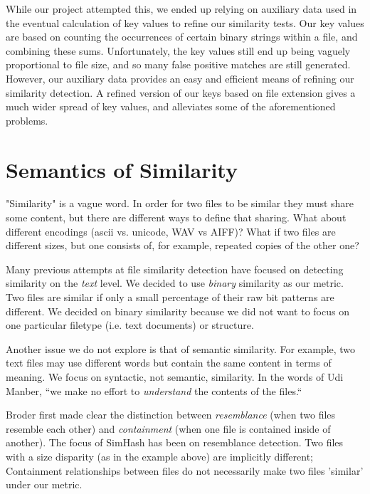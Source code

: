 \documentclass[10pt, twocolumn]{article}
\begin{document}
While our project attempted this, we ended up relying on auxiliary data used in the eventual calculation of key values to refine our similarity tests.  Our key values are based on counting the occurrences of certain binary strings within a file, and combining these sums.  Unfortunately, the key values still end up being vaguely proportional to file size, and so many false positive matches are still generated.  However, our auxiliary data provides an easy and efficient means of refining our similarity detection.  A refined version of our keys based on file extension gives a much wider spread of key values, and alleviates some of the aforementioned problems.

\section{Semantics of Similarity}

"Similarity" is a vague word. In order for two files to be similar they must share some content, but there are different ways to define that sharing. What about different encodings (ascii vs. unicode, WAV vs AIFF)? What if two files are different sizes, but one consists of, for example, repeated copies of the other one? 

Many previous attempts at file similarity detection have focused on detecting similarity on the \emph{text} \cite{hpDocRepositories, hoad} level. We decided to use \emph{binary} similarity as our metric. Two files are similar if only a small percentage of their raw bit patterns are different. We decided on binary similarity because we did not want to focus on one particular filetype (i.e. text documents) or structure. 

Another issue we do not explore is that of semantic similarity. For example, two text files may use different words but contain the same content in terms of meaning. We focus on syntactic, not semantic, similarity. In the words of Udi Manber, ``we make no effort to \emph{understand} the contents of the files.`` \cite{manber}

Broder \cite{broder} first made clear the distinction between \emph{resemblance} (when two files resemble each other) and \emph{containment} (when one file is contained inside of another). The focus of SimHash has been on resemblance detection. Two files with a size disparity (as in the example above) are implicitly different; Containment relationships between files do not necessarily make two files 'similar' under our metric.
\end{document}
